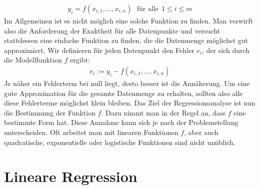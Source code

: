 \begin{align*}
    y_i = f(x_{i, 1}, \dots, x_{i, n}) ~~~\text{für alle}~~ 1 \leq i \leq m
\end{align*}
Im Allgemeinen ist es nicht möglich eine solche Funktion zu finden. Man verwirft also die Anforderung der Exaktheit für alle Datenpunkte und versucht stattdessen eine einfache Funktion zu finden, die die Datenmenge möglichst gut approximiert. Wir definieren für jeden Datenpunkt den Fehler $e_i$, der sich durch die Modellfunktion $f$ ergibt:
\begin{align*}
    e_i := y_i - f(x_{i, 1}, \dots, x_{i, n})
\end{align*}
Je näher ein Fehlerterm bei null liegt, desto besser ist die Annäherung. Um eine gute Approximation für die gesamte Datenmenge zu erhalten, sollten also alle diese Fehlerterme möglichst klein bleiben. Das Ziel der Regressionsanalyse ist nun die Bestimmung der Funktion $f$. Dazu nimmt man in der Regel an, dass $f$ eine bestimmte Form hat. Diese Annahme kann sich je nach der Problemstellung unterscheiden. Oft arbeitet man mit linearen Funktionen $f$, aber auch quadratische, exponentielle oder logistische Funktionen sind nicht unüblich.

\section{Lineare Regression}

